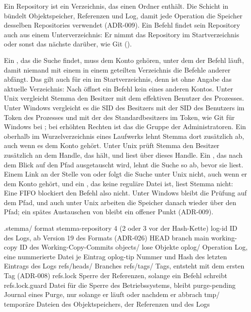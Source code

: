 Ein Repository ist ein Verzeichnis, das einen Ordner  enthält.
Die Schicht  in  bündelt Objektspeicher, Referenzen und Log,
damit jede Operation die Speicher desselben Repositories verwendet (ADR-009).
Ein Befehl findet sein Repository auch aus einem Unterverzeichnis:
Er nimmt das Repository im Startverzeichnis oder sonst das nächste darüber, wie Git
().

Ein , das die Suche findet, muss dem Konto gehören, unter dem der Befehl läuft,
damit niemand mit einem  in einem geteilten Verzeichnis die Befehle
anderer abfängt. Das gilt auch für ein  im Startverzeichnis,
denn  ist ohne Angabe das aktuelle Verzeichnis: Nach  öffnet ein
Befehl kein  eines anderen Kontos.
Unter Unix vergleicht Stemma den Besitzer mit dem effektiven Benutzer des Prozesses.
Unter Windows vergleicht es die SID des Besitzers mit der SID des Benutzers im Token des
Prozesses und mit der des Standardbesitzers im Token, wie Git für Windows bei
; bei erhöhten Rechten ist das die Gruppe der Administratoren.
Ein  oberhalb im Wurzelverzeichnis eines Laufwerks lehnt Stemma dort
zusätzlich ab, auch wenn es dem Konto gehört.
Unter Unix prüft Stemma den Besitzer zusätzlich an dem Handle, das  hält,
und liest  über dieses Handle.
Ein , das nach dem Blick auf den Pfad ausgetauscht wird,
lehnt die Suche so ab, bevor sie  liest.
Einem Link an der Stelle von  oder  folgt die Suche unter Unix
nicht, auch wenn er dem Konto gehört, und ein , das keine reguläre Datei ist,
liest Stemma nicht: Eine FIFO blockiert den Befehl also nicht.
Unter Windows bleibt die Prüfung auf dem Pfad, und auch unter Unix arbeiten die Speicher
danach wieder über den Pfad; ein spätes Austauschen von 
bleibt ein offener Punkt (ADR-009).

\starttyping
.stemma/
    format        stemma-repository 4 (2 oder 3 vor der Hash-Kette)
    log-id        ID des Logs, ab Version 19 des Formats (ADR-026)
    HEAD          branch main
    working-copy  ID des Working-Copy-Commits
    objects/      lose Objekte
    oplog/        Operation Log, eine nummerierte Datei je Eintrag
    oplog-tip     Nummer und Hash des letzten Eintrags des Logs
    refs/heads/   Branches
    refs/tags/    Tags, entsteht mit dem ersten Tag (ADR-008)
    refs.lock     Sperre der Referenzen, solange ein Befehl schreibt
    refs.lock.guard  Datei für die Sperre des Betriebssystems, bleibt
    purge-pending Journal eines Purge, nur solange er läuft oder nachdem er abbrach
    tmp/          temporäre Dateien des Objektspeichers, der Referenzen und des Logs
\stoptyping


